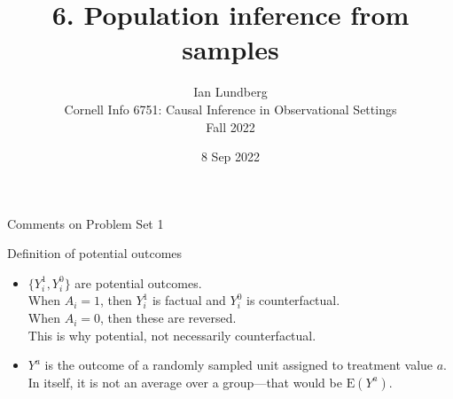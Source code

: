 \documentclass{beamer}
\title{6. Population inference from samples}
\author{Ian Lundberg\\Cornell Info 6751: Causal Inference in Observational Settings\\Fall 2022}
\date{8 Sep 2022}
\newcommand\E{\text{E}}
\begin{document}
\maketitle

\begin{frame}{Comments on Problem Set 1}

Definition of potential outcomes
\begin{itemize}
\item $\{Y_i^1,Y_i^0\}$ are potential outcomes.\\When $A_i = 1$, then $Y_i^1$ is factual and $Y_i^0$ is counterfactual.\\When $A_i = 0$, then these are reversed.\\This is why potential, not necessarily counterfactual.
\item $Y^a$ is the outcome of a randomly sampled unit assigned to treatment value $a$. In itself, it is not an average over a group---that would be $\E(Y^a)$.
\end{itemize}

\end{frame}


\end{document}

